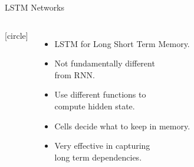 \begin{frame}{LSTM Networks}
    \begin{columns}
        [circle]
        \begin{itemize}
            \item{LSTM for Long Short Term Memory.}
            \vspace{0.2cm}
            \item{Not fundamentally different\\from RNN.}
            \vspace{0.2cm}
            \item{Use different functions to\\compute hidden state.}
            \vspace{0.2cm}
            \item{Cells decide what to keep in memory.}
            \vspace{0.2cm}
            \item{Very effective in capturing\\long term dependencies.}
        \end{itemize}
        \begin{figure}
            \label{fig:rnn-vs-lstm}
        \end{figure}
    \end{columns}
\end{frame}

